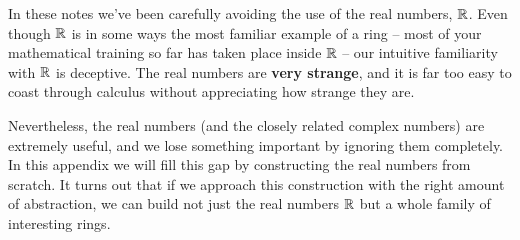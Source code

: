In these notes we've been carefully avoiding the use of the real numbers, \(\mathbb{R}\). Even though \(\mathbb{R}\) is in some ways the most familiar example of a ring -- most of your mathematical training so far has taken place inside \(\mathbb{R}\) -- our intuitive familiarity with \(\mathbb{R}\) is deceptive. The real numbers are \textbf{very strange}, and it is far too easy to coast through calculus without appreciating how strange they are.

Nevertheless, the real numbers (and the closely related complex numbers) are extremely useful, and we lose something important by ignoring them completely. In this appendix we will fill this gap by constructing the real numbers from scratch. It turns out that if we approach this construction with the right amount of abstraction, we can build not just the real numbers \(\mathbb{R}\) but a whole family of interesting rings.
